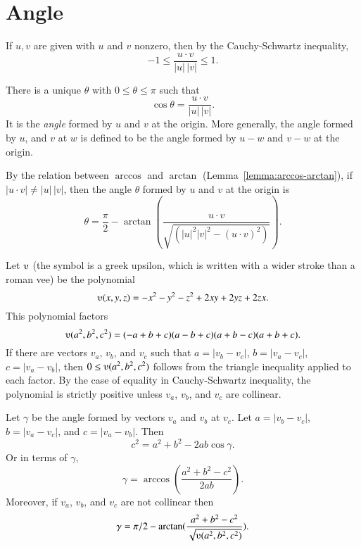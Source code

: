 \section{Angle}



If $u,v$ are given with $u$ and $v$ nonzero, then by the
Cauchy-Schwartz inequality,
    $$-1 \le \frac{u\cdot v}{|u|\,|v|} \le 1.$$

\begin{definition}\label{def:angle}
There is a unique $\theta$ with $0\le\theta\le\pi$ such that
    $$\cos\theta = \frac{u\cdot v}{|u|\,|v|}.$$
It is the {\it angle} formed by $u$ and $v$ at the origin. More
generally, the angle formed by $u$, and $v$ at $w$ is defined to be
the angle formed by $u-w$ and $v-w$ at the origin.
\end{definition}

By the relation between $\arccos$ and $\arctan$
(Lemma~\ref{lemma:arccos-arctan}), if $|u\cdot v|\ne |u|\,|v|$,
then the angle $\theta$ formed by $u$ and $v$ at the origin is
    \begin{equation}\label{eqn:angle}
    \theta = \frac{\pi}2 - \arctan\left (\frac {u\cdot v}{\sqrt{(|u|^2|v|^2 -
    (u\cdot v)^2)}}\right).
    \end{equation}

Let $\ups$ (the symbol is a greek upsilon, which is written with a
wider stroke than a roman vee) be the polynomial
    $$\ups(x,y,z) = -x^2 - y^2 - z^2 + 2 x y + 2 y z + 2 z x.$$
This polynomial factors
    $$\ups(a^2,b^2,c^2) = (-a + b + c) (a - b + c) (a + b - c) (a + b +
    c).$$
If there are vectors $v_a$, $v_b$, and $v_c$ such that $a = |v_b
- v_c|$, $b = |v_a - v_c|$, $c = |v_a - v_b|$, then $0\le
\ups(a^2,b^2,c^2)$ follows from the triangle inequality applied to
each factor.  By the case of equality in Cauchy-Schwartz
inequality, the polynomial is strictly positive unless $v_a$,
$v_b$, and $v_c$ are collinear.



\begin{lemma}
    Let $\gamma$ be the angle formed by vectors $v_a$ and $v_b$ at $v_c$.  Let $a
    = |v_b - v_c|$, $b = |v_a - v_c|$, and $c = |v_a - v_b|$.  Then
        $$c^2 = a^2 + b^2 - 2 a b \cos\gamma.$$
Or in terms of $\gamma$,
    $$\gamma = \arccos(\frac{a^2 + b^2 - c^2}{2 a b}).$$
Moreover, if $v_a$, $v_b$, and $v_c$ are not collinear then
    $$\gamma=
    \pi/2 - \arctan(\frac{ a^2 + b^2 - c^2}{\sqrt{\ups(a^2,b^2,c^2)}}).
    $$
\end{lemma} 

